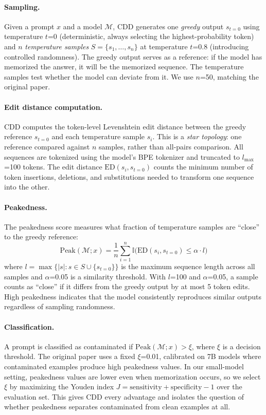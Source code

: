 \documentclass[11pt]{article}
\begin{document}
\paragraph{Sampling.} Given a prompt $x$ and a model $\mathcal{M}$, CDD generates one \emph{greedy} output $s_{t=0}$ using temperature $t$=0 (deterministic, always selecting the highest-probability token) and $n$ \emph{temperature samples} $S = \{s_1, \ldots, s_n\}$ at temperature $t$=0.8 (introducing controlled randomness). The greedy output serves as a reference: if the model has memorized the answer, it will be the memorized sequence. The temperature samples test whether the model can deviate from it. We use $n$=50, matching the original paper.

\paragraph{Edit distance computation.} CDD computes the token-level Levenshtein edit distance between the greedy reference $s_{t=0}$ and each temperature sample $s_i$. This is a \emph{star topology}: one reference compared against $n$ samples, rather than all-pairs comparison. All sequences are tokenized using the model's BPE tokenizer and truncated to $l_{\max}$=100 tokens. The edit distance $\text{ED}(s_i, s_{t=0})$ counts the minimum number of token insertions, deletions, and substitutions needed to transform one sequence into the other.

\paragraph{Peakedness.} The peakedness score measures what fraction of temperature samples are ``close'' to the greedy reference:
\begin{equation}
\text{Peak}(\mathcal{M}; x) = \frac{1}{n}\sum_{i=1}^{n} \mathbb{I}\big(\text{ED}(s_i, s_{t=0}) \leq \alpha \cdot l\big)
\end{equation}
where $l = \max\{|s| : s \in S \cup \{s_{t=0}\}\}$ is the maximum sequence length across all samples and $\alpha$=0.05 is a similarity threshold. With $l$=100 and $\alpha$=0.05, a sample counts as ``close'' if it differs from the greedy output by at most 5 token edits. High peakedness indicates that the model consistently reproduces similar outputs regardless of sampling randomness.

\paragraph{Classification.} A prompt is classified as contaminated if $\text{Peak}(\mathcal{M}; x) > \xi$, where $\xi$ is a decision threshold. The original paper uses a fixed $\xi$=0.01, calibrated on 7B models where contaminated examples produce high peakedness values. In our small-model setting, peakedness values are lower even when memorization occurs, so we select $\xi$ by maximizing the Youden index $J = \text{sensitivity} + \text{specificity} - 1$ \citep{youden1950index} over the evaluation set. This gives CDD every advantage and isolates the question of whether peakedness separates contaminated from clean examples at all.
\end{document}
